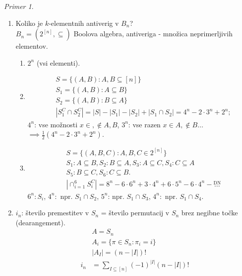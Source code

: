 \documentclass[a4paper, 12pt]{book}
\theoremstyle{definition}
\theoremstyle{remark}
\newtheorem*{ex}{Primer}
\begin{document}

\begin{ex}
  \begin{enumerate}[label=(\arabic{*})] \text{}
    \item Koliko je $k$-elementnih antiverig v $B_n$? \\
      $B_n = (2^{[n]}, \subseteq)$ Boolova algebra, antiveriga - množica neprimerljivih elementov.
      \begin{enumerate}[label={k=\arabic*:}]
        \item $2^n$ (vsi elementi).
        \item 
          \begin{align*}
            &S = \{(A,B): A, B \subseteq [n]\} \\
            &S_1 = \{(A,B): A \subseteq B\} \\
            &S_2 = \{(A,B): B \subseteq A\} \\
            &|S_1^C \cap S_2^C| = |S| - |S_1| - |S_2| + |S_1 \cap S_2| = 4^n - 2 \cdot 3^n + 2^n;
          \end{align*}
          $4^n$: vse možnosti $x \in, \notin A,B$, $3^n$: vse razen $x \in A, \notin B \dots$ \\
          $\implies \frac{1}{2} (4^n - 2 \cdot 3^n + 2^n)$.
        \item
          \begin{align*}
            &S = \{(A,B,C): A,B,C \in 2^{[n]}\} \\
            &S_1: A \subseteq B, S_2: B \subseteq A, S_3: A \subseteq C, S_4: C \subseteq A \\
            &S_5: B \subseteq C, S_6: C \subseteq B. \\
            &|\cap_{i=1}^6 S_i^C| = 8^n - 6 \cdot 6^n + 3 \cdot 4^n + 6 \cdot 5^n - 6 \cdot 4^n - \stackrel{\text{DN}}{\dots}
          \end{align*}
          $6^n: S_i$, $4^n:$ npr. $S_1 \cap S_2$, $5^n$: npr. $S_1 \cap S_3$, $4^n:$ npr. $S_1 \cap S_4$.
      \end{enumerate}
    \item $i_n$: število premestitev v $S_n$ = število permutacij v $S_n$ brez negibne točke (dearangement).
      \begin{align*}
        &A = S_n \\
        &A_i = \{\pi \in S_n: \pi_i = i\} \\
        &|A_{I}| = (n - |I|)! \\
        i_n &= \sum_{I \subseteq [n]} (-1)^{|I|} (n - |I|)! \\

\end{align*}
\end{enumerate}
\end{ex}
\end{document}
